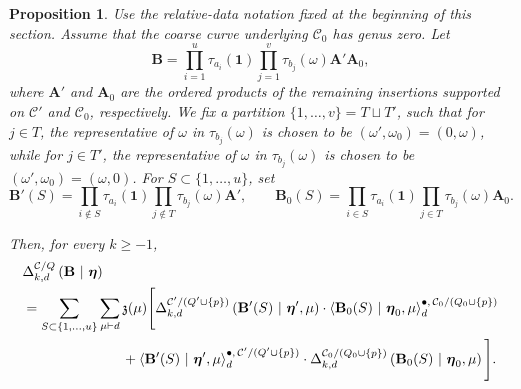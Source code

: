 \documentclass[letterpaper,12pt]{amsart}
\newtheorem{prop}[thm]{Proposition}
\theoremstyle{definition}
\newcommand{\id}{\mathbf 1}
\newcommand{\cC}{\mathcal C}
\numberwithin{equation}{section}
\begin{document}
\begin{prop}
\label{prop:virasoro-defect-degeneration}
Use the relative-data notation fixed at the beginning of this section.
Assume that the coarse curve underlying \(\cC_0\)
has genus zero.
Let
\[
\mathbf B=
\prod_{i=1}^{u}\tau_{a_i}(\id)
\prod_{j=1}^{v}\tau_{b_j}(\omega)
\mathbf A'\mathbf A_0,
\]
where \(\mathbf A'\) and \(\mathbf A_0\) are the ordered products of the
remaining insertions supported on \(\cC'\) and \(\cC_0\), respectively. We fix a partition \(\{1,\ldots,v\}=T\sqcup T'\), such that for $j\in T$, the representative of $\omega$ in $\tau_{b_j}(\omega)$ is chosen to be $(\omega',\omega_0)=(0,\omega)$, while for $j\in T'$, the representative of $\omega$ in $\tau_{b_j}(\omega)$ is chosen to be $(\omega',\omega_0)=(\omega,0)$. For \(S\subset\{1,\ldots,u\}\), set
\[
\mathbf B'(S)
=
\prod_{i\notin S}\tau_{a_i}(\id)
\prod_{j\notin T}\tau_{b_j}(\omega)
\mathbf A',
\qquad
\mathbf B_0(S)
=
\prod_{i\in S}\tau_{a_i}(\id)
\prod_{j\in T}\tau_{b_j}(\omega)
\mathbf A_0.
\]

Then, for every \(k\geq-1\),
\begin{equation}
\label{eq:virasoro-defect-degeneration}
\begin{aligned}
&
\Delta_{k,d}^{\cC/Q}
\left(
\mathbf B
\ \middle|\
\boldsymbol\eta
\right)
\\
&=
\sum_{S\subset\{1,\ldots,u\}}
\sum_{\mu\vdash d}
\mathfrak z(\mu)
\Bigg[
\Delta_{k,d}^{\cC'/(Q'\cup\{p\})}
\left(
\mathbf B'(S)
\ \middle|\
\boldsymbol\eta',\mu
\right)\cdot
\left\langle
\mathbf B_0(S)
\ \middle|\
\boldsymbol\eta_0,\mu
\right\rangle^{\bullet,\,\cC_0/(Q_0\cup\{p\})}_{d}
\\
&\hspace{25mm}
+
\left\langle
\mathbf B'(S)
\ \middle|\
\boldsymbol\eta',\mu
\right\rangle^{\bullet,\,\cC'/(Q'\cup\{p\})}_{d}\cdot
\Delta_{k,d}^{\cC_0/(Q_0\cup\{p\})}
\left(
\mathbf B_0(S)
\ \middle|\
\boldsymbol\eta_0,\mu
\right)
\Bigg].
\end{aligned}
\end{equation}
\end{prop}
\end{document}
